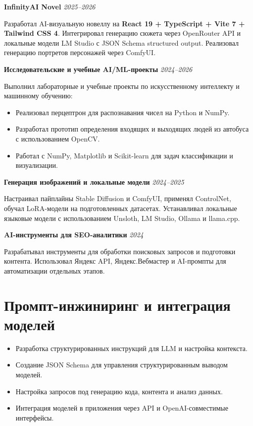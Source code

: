 \documentclass[10pt,a4paper]{article}
\newcommand{\projectEntry}[3]{\textbf{#1} \hfill \textit{#2}\par #3\par\vspace{0.3em}}
\begin{document}
\projectEntry{InfinityAI Novel}{2025--2026}
{Разработал AI-визуальную новеллу на \textbf{React 19 + TypeScript + Vite 7 + Tailwind CSS 4}. Интегрировал генерацию сюжета через OpenRouter API и локальные модели LM Studio с JSON Schema structured output. Реализовал генерацию портретов персонажей через ComfyUI.}

\projectEntry{Исследовательские и учебные AI/ML-проекты}{2024--2026}
{Выполнил лабораторные и учебные проекты по искусственному интеллекту и машинному обучению:
\begin{itemize}
    \item Реализовал перцептрон для распознавания чисел на Python и NumPy.
    \item Разработал прототип определения входящих и выходящих людей из автобуса с использованием OpenCV.
    \item Работал с NumPy, Matplotlib и Scikit-learn для задач классификации и визуализации.
\end{itemize}}

\projectEntry{Генерация изображений и локальные модели}{2024--2025}
{Настраивал пайплайны Stable Diffusion и ComfyUI, применял ControlNet, обучал LoRA-модели на подготовленных датасетах. Устанавливал локальные языковые модели с использованием Unsloth, LM Studio, Ollama и llama.cpp.}

\projectEntry{AI-инструменты для SEO-аналитики}{2024}
{Разрабатывал инструменты для обработки поисковых запросов и подготовки контента. Использовал Яндекс API, Яндекс.Вебмастер и AI-промпты для автоматизации отдельных этапов.}

\section{Промпт-инжиниринг и интеграция моделей}

\begin{itemize}
    \item Разработка структурированных инструкций для LLM и настройка контекста.
    \item Создание JSON Schema для управления структурированным выводом моделей.
    \item Настройка запросов под генерацию кода, контента и анализ данных.
    \item Интеграция моделей в приложения через API и OpenAI-совместимые интерфейсы.
\end{itemize}
\end{document}
